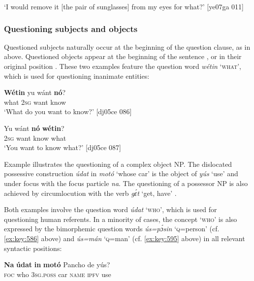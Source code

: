 \glt ‘I would remove it [the pair of sunglasses] from my eyes for what?’ [ye07ga 011]
\z

\subsubsection{Questioning subjects and objects}

Questioned subjects naturally occur at the beginning of the question clause, as in  above. Questioned objects appear at the beginning of the sentence , or in their original position . These two examples feature the question word \textit{wétin} ‘\textsc{what’}, which is used for questioning inanimate entities: 


\ea%
    \label{ex:key:600}
    \gll \textbf{Wétin}  yu  wánt  \textbf{nó}?\\
what  \textsc{2sg}  want  know\\

\glt ‘What do you want to know?’ [dj05ce 086]
\z


\ea%
    \label{ex:key:601}
    \gll Yu  wánt  \textbf{nó}    \textbf{wétin}?\\
\textsc{2sg}  want  know  what\\

\glt ‘You want to know what?’ [dj05ce 087]
\z

Example  illustrates the questioning of a complex object NP. The dislocated possessive construction{\fff} \textit{údat} in \textit{motó} ‘whose car’ is the object of \textit{yús} ‘use’ and under focus with the focus particle \textit{na}. The questioning of a possessor NP is also achieved by circumlocution with the verb \textit{gɛ́t} ‘get, have’ . 


Both examples involve the question word \textit{údat} ‘\textsc{who’}, which is used for questioning human referents. In a minority of cases, the concept ‘\textsc{who’} is also expressed by the bimorphemic question words \textit{ús=pɔ́sin} ‘\textsc{q}=person’ (cf. \ref{ex:key:586} above) and \textit{ús=mán} ‘\textsc{q}=man’ (cf. \ref{ex:key:595} above) in all relevant syntactic positions: 



\ea%
    \label{ex:key:602}
    \gll \textbf{Na}  \textbf{údat}  \textbf{in}    \textbf{motó}  Pancho  de  yús?\\
\textsc{foc}  who    \textsc{3sg.poss}  car    \textsc{name}  \textsc{ipfv}  use\\

